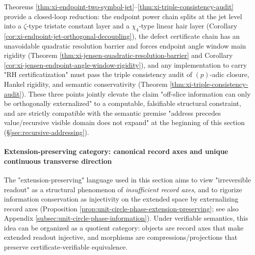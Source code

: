 \begin{remark}\label{rem:xi-auditable-reduction-closed-loop}
Theorems \ref{thm:xi-endpoint-two-symbol-jet}--\ref{thm:xi-triple-consistency-audit} provide a closed-loop reduction:
the endpoint power chain splits at the jet level into a \(\zeta\)-type tristate constant layer and a \(\chi_4\)-type linear hair layer (Corollary \ref{cor:xi-endpoint-jet-orthogonal-decoupling}),
the defect certificate chain has an unavoidable quadratic resolution barrier and forces endpoint angle window main rigidity (Theorem \ref{thm:xi-jensen-quadratic-resolution-barrier} and Corollary \ref{cor:xi-jensen-endpoint-angle-window-rigidity}),
and any implementation to carry "RH certificatization" must pass the triple consistency audit of \((p)\)-adic closure, Hankel rigidity, and semantic conservativity (Theorem \ref{thm:xi-triple-consistency-audit}).
These three points jointly elevate the claim "off-slice information can only be orthogonally externalized" to a computable, falsifiable structural constraint, and are strictly compatible with the semantic premise "address precedes value/recursive visible domain does not expand" at the beginning of this section (\S\ref{sec:recursive-addressing}).
\end{remark}

\paragraph{Extension-preserving category: canonical record axes and unique continuous transverse direction}
The "extension-preserving" language used in this section aims to view "irreversible readout" as a structural phenomenon of \emph{insufficient record axes}, and to rigorize information conservation as injectivity on the extended space by externalizing record axes (Proposition \ref{prop:unit-circle-phase-extension-preserving}; see also Appendix \ref{subsec:unit-circle-phase-information}).
Under verifiable semantics, this idea can be organized as a quotient category: objects are record axes that make extended readout injective, and morphisms are compressions/projections that preserve certificate-verifiable equivalence.

